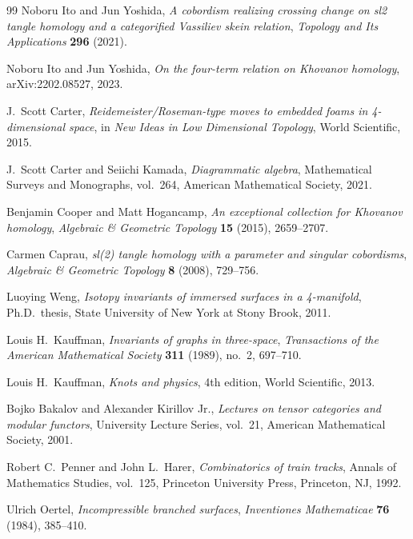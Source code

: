 \documentclass[12pt, a4paper]{article}
\theoremstyle{plain}
\theoremstyle{definition}
\theoremstyle{correspondence}
\begin{document}
\begin{thebibliography}{99}
Noboru Ito and Jun Yoshida,
\textit{A cobordism realizing crossing change on sl2 tangle homology and a
categorified Vassiliev skein relation},
\textit{Topology and Its Applications} \textbf{296} (2021).

Noboru Ito and Jun Yoshida,
\textit{On the four-term relation on Khovanov homology},
arXiv:2202.08527, 2023.

J.~Scott Carter,
\textit{Reidemeister/Roseman-type moves to embedded foams in 4-dimensional space},
in \textit{New Ideas in Low Dimensional Topology},
World Scientific, 2015.

J.~Scott Carter and Seiichi Kamada,
\textit{Diagrammatic algebra},
Mathematical Surveys and Monographs, vol.~264,
American Mathematical Society, 2021.

Benjamin Cooper and Matt Hogancamp,
\textit{An exceptional collection for Khovanov homology},
\textit{Algebraic \& Geometric Topology} \textbf{15} (2015), 2659--2707.

Carmen Caprau,
\textit{sl(2) tangle homology with a parameter and singular cobordisms},
\textit{Algebraic \& Geometric Topology} \textbf{8} (2008), 729--756.

Luoying Weng,
\textit{Isotopy invariants of immersed surfaces in a 4-manifold},
Ph.D.\ thesis, State University of New York at Stony Brook, 2011.

Louis H.~Kauffman,
\textit{Invariants of graphs in three-space},
\textit{Transactions of the American Mathematical Society} \textbf{311} (1989), no.~2, 697--710.

Louis H.~Kauffman,
\textit{Knots and physics},
4th edition, World Scientific, 2013.

Bojko Bakalov and Alexander Kirillov Jr.,
\textit{Lectures on tensor categories and modular functors},
University Lecture Series, vol.~21,
American Mathematical Society, 2001.


Robert C.~Penner and John L.~Harer,
\textit{Combinatorics of train tracks},
Annals of Mathematics Studies, vol.~125,
Princeton University Press, Princeton, NJ, 1992.

Ulrich Oertel,
\textit{Incompressible branched surfaces},
\textit{Inventiones Mathematicae} \textbf{76} (1984), 385--410.


\end{thebibliography}
\end{document}
